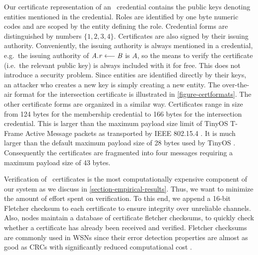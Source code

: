 Our certificate representation of an \RT\ credential contains the
public keys denoting entities mentioned in the credential. Roles are
identified by one byte numeric codes and are scoped by the entity
defining the role. Credential forms are distinguished by numbers $\{
1, 2, 3, 4 \}$.  Certificates are also signed by their issuing
authority. Conveniently, the issuing authority is always mentioned in
a credential, e.g.~the issuing authority of $\mathit{A.r} \stackrel{}{\longleftarrow} \mathit{B}$ is $A$, so
the means to verify the certificate (i.e.~the relevant public key) is
always included with it for free. This does not introduce a security
problem. Since entities are identified directly by their keys, an
attacker who creates a new key is simply creating a new entity. The
over-the-air format for the intersection certificate is illustrated in
\autoref{figure-certformats}.  The other certificate forms are
organized in a similar way.  Certificates range in size from 124 bytes
for the membership credential to 166 bytes for the intersection
credential. This is larger than the maximum payload size limit of
TinyOS T-Frame Active Message packets as transported by IEEE 802.15.4
\cite{802.15.4,hui-tep125}. It is much larger than the default maximum
payload size of 28 bytes used by TinyOS
\cite{levis-tep111}. Consequently the certificates are fragmented into
four messages requiring a maximum payload size of 43 bytes.

Verification of \RT\ certificates is the most computationally
expensive component of our system as we discuss in
\autoref{section-empirical-results}. Thus, we want to minimize the
amount of effort spent on verification. To this end, we append a
16-bit Fletcher checksum to each certificate to ensure integrity over
unreliable channels.  Also, nodes maintain a database of certificate
fletcher checksums, to quickly check whether a certificate has already
been received and verified. Fletcher checksums are commonly used in
WSNs since their error detection properties are almost as good as CRCs
with significantly reduced computational cost \cite{fletcher-1982}.


